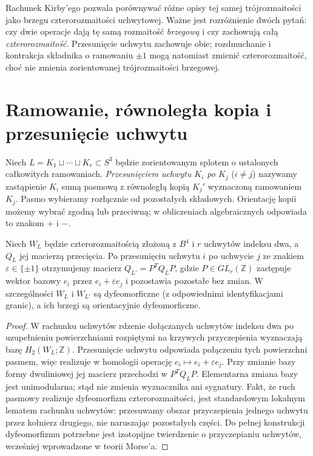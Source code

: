 Rachunek Kirby'ego pozwala porównywać różne opisy
tej samej trójrozmaitości jako brzegu czterorozmaitości
uchwytowej. Ważne jest rozróżnienie dwóch pytań:
czy dwie operacje dają tę samą rozmaitość \emph{brzegową}
i czy zachowują całą \emph{czterorozmaitość}.
Przesunięcie uchwytu zachowuje obie;
rozdmuchanie i kontrakcja składnika o ramowaniu $\pm1$
mogą natomiast zmienić czterorozmaitość,
choć nie zmienia zorientowanej trójrozmaitości brzegowej.

\section{Ramowanie, równoległa kopia i przesunięcie uchwytu}
\label{sec:tg-kirby-slides}

\begin{definicja}
Niech $L=K_1\sqcup\cdots\sqcup K_r\subset S^3$
będzie zorientowanym splotem o ustalonych całkowitych
ramowaniach. \emph{Przesunięciem uchwytu $K_i$ po $K_j$}
($i\ne j$) nazywamy zastąpienie $K_i$ sumą pasmową
z równoległą kopią $K_j'$ wyznaczoną ramowaniem $K_j$.
Pasmo wybieramy rozłącznie od pozostałych składowych.
Orientację kopii możemy wybrać zgodną lub przeciwną;
w obliczeniach algebraicznych odpowiada to znakom $+$ i $-$.
\end{definicja}

\begin{stwierdzenie}
\label{prop:tg-kirby-congruence}
Niech $W_L$ będzie czterorozmaitością złożoną z $B^4$
i $r$ uchwytów indeksu dwa, a $Q_L$ jej macierzą przecięcia.
Po przesunięciu uchwytu $i$ po uchwycie $j$ ze znakiem
$\varepsilon\in\{\pm1\}$ otrzymujemy macierz
$Q_{L'}=P^TQ_LP$, gdzie $P\in GL_r(\mathbb Z)$
zastępuje wektor bazowy $e_i$ przez
$e_i+\varepsilon e_j$ i pozostawia pozostałe bez zmian.
W szczególności $W_L$ i $W_{L'}$ są dyfeomorficzne
(z odpowiednimi identyfikacjami granic), a ich brzegi
są orientacyjnie dyfeomorficzne.
\end{stwierdzenie}

\begin{proof}
W rachunku uchwytów rdzenie dołączanych uchwytów indeksu dwa
po uzupełnieniu powierzchniami rozpiętymi na krzywych
przyczepienia wyznaczają bazę $H_2(W_L;\mathbb Z)$.
Przesunięcie uchwytu odpowiada połączeniu tych powierzchni
pasmem, więc realizuje w homologii operację
$e_i\mapsto e_i+\varepsilon e_j$.
Przy zmianie bazy formy dwuliniowej jej macierz
przechodzi w $P^TQ_LP$. Elementarna zmiana bazy
jest unimodularna; stąd nie zmienia wyznacznika ani
sygnatury. Fakt, że ruch pasmowy realizuje dyfeomorfizm
czterorozmaitości, jest standardowym lokalnym lematem
rachunku uchwytów: przesuwamy obszar przyczepienia
jednego uchwytu przez kołnierz drugiego, nie naruszając
pozostałych części. Do pełnej konstrukcji dyfeomorfizmu
potrzebne jest izotopijne twierdzenie o przyczepianiu
uchwytów, wcześniej wprowadzone w teorii Morse'a.
\end{proof}

